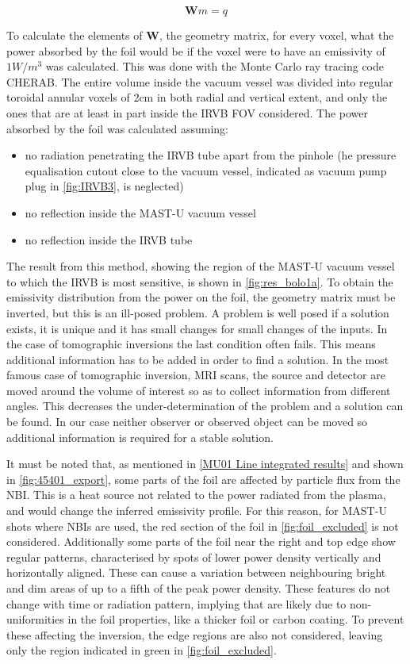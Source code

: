 \begin{equation}
\bm{W}m=q
\label{eq:gmq}
\end{equation}

To calculate the elements of $\bm{W}$, the geometry matrix, for every voxel,  what the power absorbed by the foil would be if the voxel were to have an emissivity of $1W/m^3$ was calculated. This was done with the Monte Carlo ray tracing code CHERAB. The entire volume inside the vacuum vessel was divided into regular toroidal annular voxels of 2cm in both radial and vertical extent, and only the ones that are at least in part inside the IRVB FOV considered. The power absorbed by the foil was calculated assuming:
\begin{itemize}
    \item no radiation penetrating the IRVB tube apart from the pinhole (he pressure equalisation cutout close to the vacuum vessel, indicated as vacuum pump plug in \autoref{fig:IRVB3}, is neglected)
    \item no reflection inside the MAST-U vacuum vessel
    \item no reflection inside the IRVB tube
\end{itemize}
The result from this method, showing the region of the MAST-U vacuum vessel to which the IRVB is most sensitive, is shown in \autoref{fig:res_bolo1a}.
To obtain the emissivity distribution from the power on the foil, the geometry matrix must be inverted, but this is an ill-posed problem. A problem is well posed if a solution exists, it is unique and it has small changes for small changes of the inputs. \cite{Hansen1998} In the case of tomographic inversions the last condition often fails. \cite{Hansen2010} This means additional information has to be added in order to find a solution. In the most famous case of tomographic inversion, MRI scans, the source and detector are moved around the volume of interest so as to collect information from different angles. This decreases the under-determination of the problem and a solution can be found. In our case neither observer or observed object can be moved so additional information is required for a stable solution.

It must be noted that, as mentioned in \autoref{MU01 Line integrated results} and shown in \autoref{fig:45401_export}, some parts of the foil are affected by particle flux from the NBI. This is a heat source not related to the power radiated from the plasma, and would change the inferred emissivity profile. For this reason, for MAST-U shots where NBIs are used, the red section of the foil in \autoref{fig:foil_excluded} is not considered. Additionally some parts of the foil near the right and top edge show regular patterns, characterised by spots of lower power density vertically and horizontally aligned. These can cause a variation between neighbouring bright and dim areas of up to a fifth of the peak power density. These features do not change with time or radiation pattern, implying that are likely due to non-uniformities in the foil properties, like a thicker foil or carbon coating. To prevent these affecting the inversion, the edge regions are also not considered, leaving only the region indicated in green in \autoref{fig:foil_excluded}.

